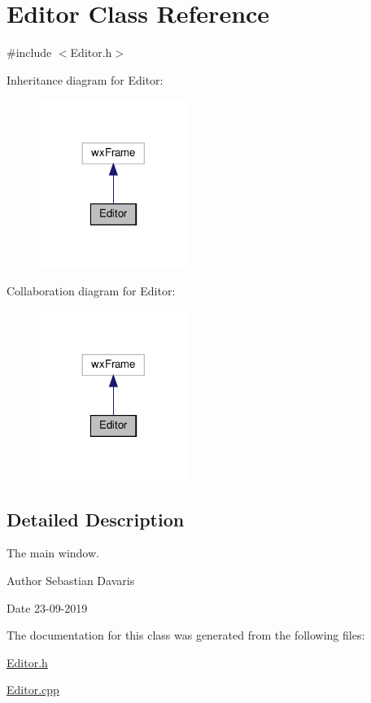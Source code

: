 \hypertarget{class_editor}{}\section{Editor Class Reference}
\label{class_editor}


{\ttfamily \#include $<$Editor.\+h$>$}



Inheritance diagram for Editor\+:
\nopagebreak
\begin{figure}[H]
\begin{center}
\leavevmode
\includegraphics[width=137pt]{class_editor__inherit__graph}
\end{center}
\end{figure}


Collaboration diagram for Editor\+:
\nopagebreak
\begin{figure}[H]
\begin{center}
\leavevmode
\includegraphics[width=137pt]{class_editor__coll__graph}
\end{center}
\end{figure}


\subsection{Detailed Description}
The main window. \begin{DoxyAuthor}{Author}
Sebastian Davaris 
\end{DoxyAuthor}
\begin{DoxyDate}{Date}
23-\/09-\/2019 
\end{DoxyDate}


The documentation for this class was generated from the following files\+:\begin{DoxyCompactItemize}
\item 
\hyperlink{_editor_8h}{Editor.\+h}\item 
\hyperlink{_editor_8cpp}{Editor.\+cpp}\end{DoxyCompactItemize}
